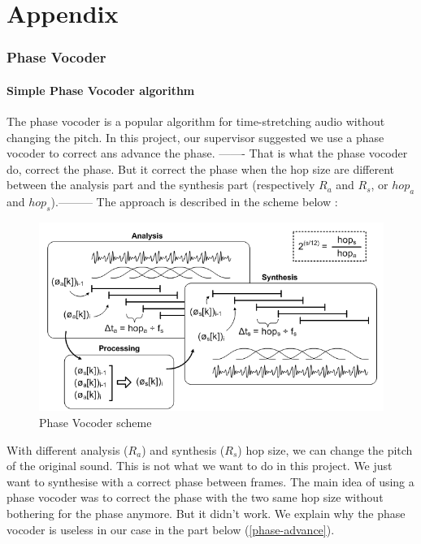 \documentclass[]{article}
\begin{document}
\newpage
\appendix
\part{Appendix}
\section{Phase Vocoder}\label{phase-vocoder-annex}
\subsection{Simple Phase Vocoder algorithm}
The phase vocoder is a popular algorithm for time-stretching audio without changing the pitch. In this project, our supervisor suggested we use a phase vocoder to correct ans advance the phase. ------- That is what the phase vocoder do, correct the phase. But it correct the phase when the hop size are different between the analysis part and the synthesis part (respectively $R_a$ and $R_s$, or $hop_a$ and $hop_s$).---------
The approach is described in the scheme below : 
\begin{figure}[H]
	\centering
	\includegraphics[scale = 0.6]{pvoverview.png}
	\caption{Phase Vocoder scheme}
\end{figure}
With different analysis ($R_a$) and synthesis ($R_s$) hop size, we can change the pitch of the original sound. This is not what we want to do in this project. We just want to synthesise with a correct phase between frames. The main idea of using a phase vocoder was to correct the phase with the two same hop size without bothering for the phase anymore. But it didn't work. We explain why the phase vocoder is useless in our case in the part below (\ref{phase-advance}).
\end{document}
